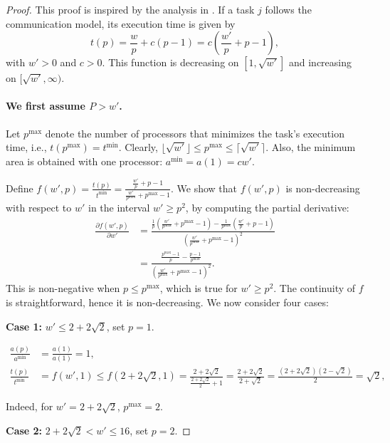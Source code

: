 \documentclass{article}
\begin{document}
\begin{proof}
This proof is inspired by the analysis in \cite{TOPC24}.  
If a task $j$ follows the communication model, its execution time is given by
\[
t(p) = \frac{w}{p} + c(p - 1) = c\left( \frac{w'}{p} + p - 1 \right),
\]
with $w' > 0$ and $c > 0$.  
This function is decreasing on $[1, \sqrt{w'}]$ and increasing on $[\sqrt{w'}, \infty)$.

\paragraph{We first assume $P>w'$.}
Let $p^{\max}$ denote the number of processors that minimizes the task’s execution time, i.e., $t(p^{\max}) = t^{\min}$.  
Clearly, $\lfloor \sqrt{w'} \rfloor \le p^{\max} \le \lceil \sqrt{w'} \rceil$.  
Also, the minimum area is obtained with one processor: $a^{\min} = a(1) = c w'$.

Define \(f(w', p) = \frac{t(p)}{t^{\min}} = \frac{\frac{w'}{p} + p - 1}{\frac{w'}{p^{\max}} + p^{\max} - 1}\).  
We show that \(f(w', p)\) is non-decreasing with respect to \(w'\) in the interval \(w' \ge p^2\), by computing the partial derivative:
\begin{align*}
\frac{\partial f(w', p)}{\partial w'} &= 
\frac{
  \frac{1}{p}\left(\frac{w'}{p^{\max}} + p^{\max} - 1\right)
  - \frac{1}{p^{\max}}\left(\frac{w'}{p} + p - 1\right)
}{
  \left( \frac{w'}{p^{\max}} + p^{\max} - 1 \right)^2
} \\
&= 
\frac{
  \frac{p^{\max} - 1}{p} - \frac{p - 1}{p^{\max}}
}{
  \left( \frac{w'}{p^{\max}} + p^{\max} - 1 \right)^2
}.
\end{align*}
This is non-negative when \(p \le p^{\max}\), which is true for \(w' \ge p^2\). The continuity of $f$ is straightforward, hence it is non-decreasing. We now consider four cases:

\textbf{Case 1:} \(w' \le 2 + 2\sqrt{2}\), set \(p = 1\).

\begin{align*}
\frac{a(p)}{a^{\min}}
      &= \frac{a(1)}{a(1)}
       = 1,\\[4pt]
\frac{t(p)}{t^{\min}}&=f(w',1) \leq f(2+2\sqrt{2},1)=\frac{2+2\sqrt{2}}{\frac{2+2\sqrt{2}}{2}+1} =\frac{2+2\sqrt{2}}{2+\sqrt{2}}=\frac{(2+2\sqrt{2})(2-\sqrt{2})}{2}=\sqrt{2},
\end{align*}

Indeed, for \(w' = 2 + 2\sqrt{2}\), \(p^{\max}=2\).

\textbf{Case 2:} \(2 + 2\sqrt{2} < w' \le 16\), set \(p = 2\).


\end{proof}
\end{document}
